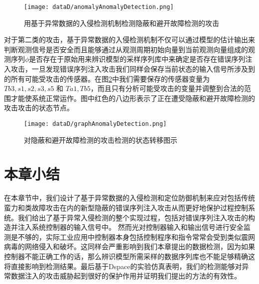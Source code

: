 		\begin{figure}[!htb]
			\centering
			\texttt{[image: dataD/anomalyAnomalyDetection.png]}
			\caption{用基于异常数据的入侵检测机制检测隐蔽和避开故障检测的攻击}
			\label{fig119}
		\end{figure}
	
对于第二类的攻击，基于异常数据的入侵检测机制不仅可以通过模型的估计输出来判断观测信号是否安全而且能够通过从观测周期初始向量到当前观测向量组成的观测序列$\phi$是否存在于原始用来辨识模型的采样序列库中来确定是否存在错误序列注入攻击，一旦发现错误序列注入攻击我们同样会保存当前状态的输入信号所涉及到的所有可能受攻击的传感器。在图\ref{fig120}中我们需要保存的传感器变量为$Tb3,s1,s2,s3,s5$ 和 $Ta1,Tb5$，而且只有分析可能受攻击的变量并调整到合法的范围才能使系统正常运作。图中红色的八边形表示了正在遭受隐蔽和避开故障检测的攻击攻击的状态节点。
	
	\begin{figure}[H]
		\centering
		\texttt{[image: dataD/graphAnomalyDetection.png]}
		\caption{对隐蔽和避开故障检测的攻击检测的状态转移图示}
		\label{fig120}
	\end{figure}

\section{本章小结}
\label{sec:insertimage}

在本章节中，我们设计了基于异常数据的入侵检测和定位防御机制来应对包括传统蛮力和类故障攻击在内的新型隐蔽的错误序列注入攻击从而更好地保护过程控制系统。我们给出了基于异常入侵检测的整个实现过程，包括对错误序列注入攻击的构造并注入系统控制器的输入信号中。 然而光对控制器输入和输出信号进行安全监测是不够的，实际工业应用中控制器本身包括控制程序和指令常常会受到类似震网病毒的网络侵入和破坏。这同样会严重影响到我们本章提出的数据检测，因为如果控制器不能正确工作的话，那么辨识模型所需采样的数据序列库也不能足够精确这将直接影响到检测结果。最后基于Dspace的实验仿真表明，我们的检测能够对异常数据注入的攻击威胁起到很好的保护作用并证明我们提出的方法的有效性。
